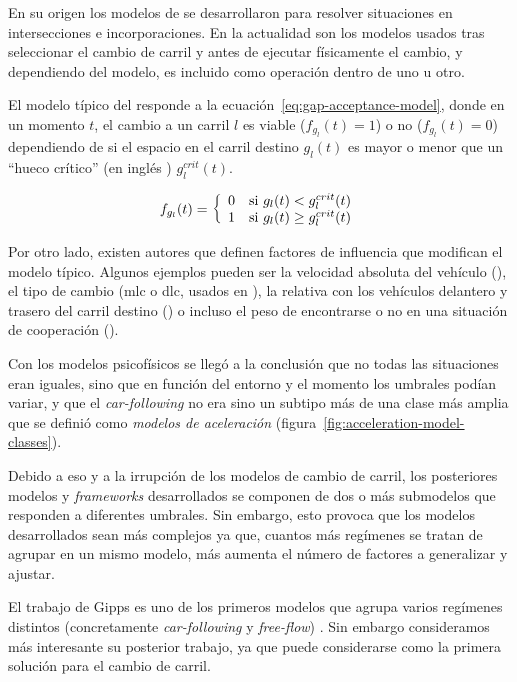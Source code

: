 En su origen los modelos de \textit{} se desarrollaron para resolver situaciones en intersecciones e incorporaciones. En la actualidad son los modelos usados tras seleccionar el cambio de carril y antes de ejecutar físicamente el cambio, y dependiendo del modelo, es incluido como operación dentro de uno u otro.

El modelo típico del \textbf{} responde a la ecuación~\ref{eq:gap-acceptance-model}, donde en un momento $t$, el cambio a un carril $l$ es viable ($f_{g_l}(t) = 1$) o no ($f_{g_l}(t) = 0$) dependiendo de si el espacio en el carril destino $g_l(t)$ es mayor o menor que un \enquote{hueco crítico} (en inglés ) $g^{crit}_l(t)$.

\begin{equation}
	f_{g_l}(t) = \twopartf {0} {g_l(t) < g^{crit}_l(t)} {1} {g_l(t) \geq g^{crit}_l(t)}
	\label{eq:gap-acceptance-model}
\end{equation}

Por otro lado, existen autores que definen factores de influencia que modifican el modelo típico. Algunos ejemplos pueden ser la velocidad absoluta del vehículo (\cite{Gipps1986, Ahmed1996}), el tipo de cambio (\acrfull{mlc} o \acrfull{dlc}, usados en \cite{Ahmed1999, Toledo2007}), la relativa con los vehículos delantero y trasero del carril destino (\cite{Ahmed1999}) o incluso el peso de encontrarse o no en una situación de cooperación (\cite{Ahmed1999, hidas2002modelling}).

Con los modelos psicofísicos se llegó a la conclusión que no todas las situaciones eran iguales, sino que en función del entorno y el momento los umbrales podían variar, y que el \textit{\gls{car-following}} no era sino un subtipo más de una clase más amplia que se definió como \textit{modelos de aceleración} (figura~\ref{fig:acceleration-model-classes}).

Debido a eso y a la irrupción de los modelos de cambio de carril, los posteriores modelos y \textit{frameworks} desarrollados se componen de dos o más submodelos que responden a diferentes umbrales. Sin embargo, esto provoca que los modelos desarrollados sean más complejos ya que, cuantos más regímenes se tratan de agrupar en un mismo modelo, más aumenta el número de factores a generalizar y ajustar.

El trabajo de Gipps es uno de los primeros modelos que agrupa varios regímenes distintos (concretamente \textit{\gls{car-following}} y \textit{\gls{free-flow}}) \cite{Gipps1981}. Sin embargo consideramos más interesante su posterior trabajo, \cite{Gipps1986} ya que puede considerarse como la primera solución para el cambio de carril.

